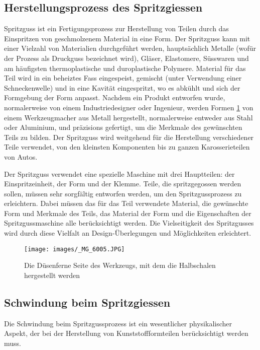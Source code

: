 \subsection{Herstellungsprozess des Spritzgiessen}
Spritzguss ist ein Fertigungsprozess zur Herstellung von Teilen durch das Einspritzen von geschmolzenem Material in eine Form. Der Spritzguss kann mit einer Vielzahl von Materialien durchgeführt werden, hauptsächlich Metalle (wofür der Prozess als Druckguss bezeichnet wird), Gläser, Elastomere, Süsswaren und am häufigsten thermoplastische und duroplastische Polymere. Material für das Teil wird in ein beheiztes Fass eingespeist, gemischt (unter Verwendung einer Schneckenwelle) und in eine Kavität eingespritzt, wo es abkühlt und sich der Formgebung der Form anpasst. Nachdem ein Produkt entworfen wurde, normalerweise von einem Industriedesigner oder Ingenieur, werden Formen \ref{fig:Werkzeugu} von einem Werkzeugmacher aus Metall hergestellt, normalerweise entweder aus Stahl oder Aluminium, und präzisions gefertigt, um die Merkmale des gewünschten Teils zu bilden. Der Spritzguss wird weitgehend für die Herstellung verschiedener Teile verwendet, von den kleinsten Komponenten bis zu ganzen Karosserieteilen von Autos.



Der Spritzguss verwendet eine spezielle Maschine mit drei Hauptteilen: der Einspritzeinheit, der Form und der Klemme. Teile, die spritzgegossen werden sollen, müssen sehr sorgfältig entworfen werden, um den Spritzgussprozess zu erleichtern. Dabei müssen das für das Teil verwendete Material, die gewünschte Form und Merkmale des Teils, das Material der Form und die Eigenschaften der Spritzgussmaschine alle berücksichtigt werden. Die Vielseitigkeit des Spritzgusses wird durch diese Vielfalt an Design-Überlegungen und Möglichkeiten erleichtert.

\begin{figure}%
   
  \texttt{[image: images/\_MG\_6005.JPG]}
  \caption{Die Düsenferne Seite des Werkzeugs, mit dem die Halbschalen hergestellt werden}
  \label{fig:Werkzeugu}
\end{figure}

\subsection{Schwindung beim Spritzgiessen}
Die Schwindung beim Spritzgussprozess ist ein wesentlicher physikalischer Aspekt, der bei der Herstellung von Kunststoffformteilen berücksichtigt werden muss.

